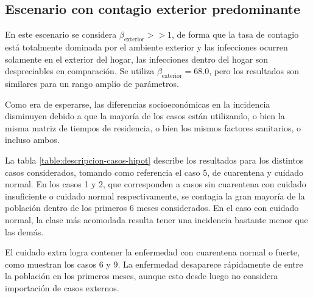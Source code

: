 \subsection{Escenario con contagio exterior predominante}\label{eval:beta-grande}


En este escenario se considera \(\beta_{\text{exterior}} >> 1\), de forma que la tasa de contagio está totalmente dominada por el ambiente exterior y las infecciones ocurren solamente en el exterior del hogar, las infecciones dentro del hogar son despreciables en comparación. Se utiliza \(\beta_{\text{exterior}} = 68.0\), pero los resultados son similares para un rango amplio de parámetros.


Como era de esperarse, las diferencias socioeconómicas en la incidencia disminuyen debido a que la mayoría de los casos están utilizando, o bien la misma matriz de tiempos de residencia, o bien los mismos factores sanitarios, o incluso ambos.

La tabla \ref{table:descripcion-casos-hipot} describe los resultados para los distintos casos considerados, tomando como referencia el caso 5, de cuarentena y cuidado normal. En los casos 1 y 2, que corresponden a casos sin cuarentena con cuidado insuficiente o cuidado normal respectivamente, se contagia la gran mayoría de la población dentro de los primeros 6 meses considerados. En el caso con cuidado normal, la clase más acomodada resulta tener una incidencia bastante menor que las demás.

El cuidado extra logra contener la enfermedad con cuarentena normal o fuerte, como muestran los casos 6 y 9. La enfermedad desaparece rápidamente de entre la población en los primeros meses, aunque esto desde luego no considera importación de casos externos.

